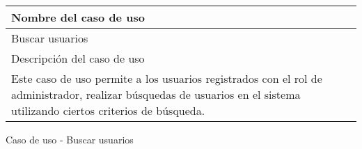 \begin{identificacionCasoDeUso}
	\begin{tabular} { | p{17cm} |}

		\hline
		Nombre del caso de uso                                                                                                                                                  \\ \hline
		Buscar usuarios                                                                                                                                                         \\ \hline
		Descripción del caso de uso                                                                                                                                             \\ \hline
		Este caso de uso permite a los usuarios registrados con el rol de administrador, realizar búsquedas de usuarios en el sistema utilizando ciertos criterios de búsqueda. \\ \hline
	\end{tabular}
	\caption{Caso de uso - Buscar usuarios}
\end{identificacionCasoDeUso}